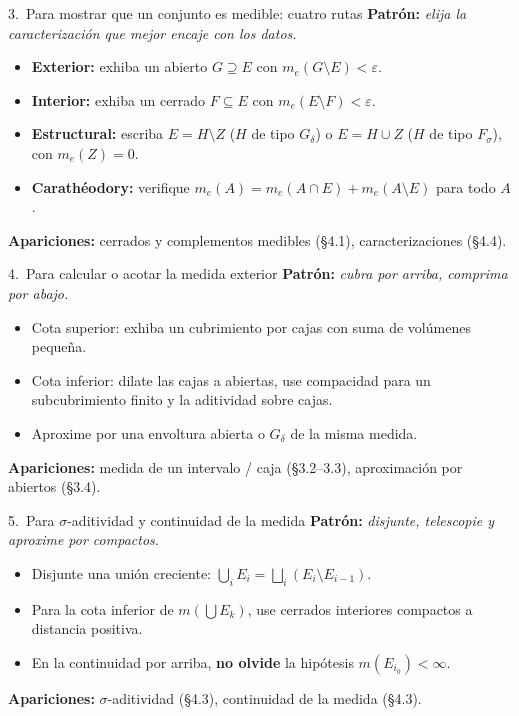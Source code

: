 \documentclass[11pt,twoside]{article}
\begin{document}
\begin{strategybox}{3.\ Para mostrar que un conjunto es medible: cuatro rutas}
\textbf{Patr\'on:} \textit{elija la caracterizaci\'on que mejor encaje con los datos.}
\begin{itemize}[leftmargin=1.5em]
\item \textbf{Exterior:} exhiba un abierto $G \supseteq E$ con $m_{e}(G \setminus E) < \varepsilon$.
\item \textbf{Interior:} exhiba un cerrado $F \subseteq E$ con $m_{e}(E \setminus F) < \varepsilon$.
\item \textbf{Estructural:} escriba $E = H \setminus Z$ ($H$ de tipo $G_{\delta}$) o $E = H \cup Z$ ($H$ de tipo $F_{\sigma}$), con $m_{e}(Z) = 0$.
\item \textbf{Carath\'eodory:} verifique $m_{e}(A) = m_{e}(A \cap E) + m_{e}(A \setminus E)$ para todo $A$.
\end{itemize}
\textbf{Apariciones:} cerrados y complementos medibles (§4.1), caracterizaciones (§4.4).
\end{strategybox}

\begin{strategybox}{4.\ Para calcular o acotar la medida exterior}
\textbf{Patr\'on:} \textit{cubra por arriba, comprima por abajo.}
\begin{itemize}[leftmargin=1.5em]
\item Cota superior: exhiba un cubrimiento por cajas con suma de vol\'umenes peque\~na.
\item Cota inferior: dilate las cajas a abiertas, use compacidad para un subcubrimiento finito y la aditividad sobre cajas.
\item Aproxime por una envoltura abierta o $G_{\delta}$ de la misma medida.
\end{itemize}
\textbf{Apariciones:} medida de un intervalo / caja (§3.2--3.3), aproximaci\'on por abiertos (§3.4).
\end{strategybox}
\newpage
\begin{strategybox}{5.\ Para $\sigma$-aditividad y continuidad de la medida}
\textbf{Patr\'on:} \textit{disjunte, telescopie y aproxime por compactos.}
\begin{itemize}[leftmargin=1.5em]
\item Disjunte una uni\'on creciente: $\bigcup_{i} E_{i} = \bigsqcup_{i}(E_{i} \setminus E_{i-1})$.
\item Para la cota inferior de $m(\bigcup E_{k})$, use cerrados interiores compactos a distancia positiva.
\item En la continuidad por arriba, \textbf{no olvide} la hip\'otesis $m(E_{i_{0}}) < \infty$.
\end{itemize}
\textbf{Apariciones:} $\sigma$-aditividad (§4.3), continuidad de la medida (§4.3).
\end{strategybox}
\end{document}
